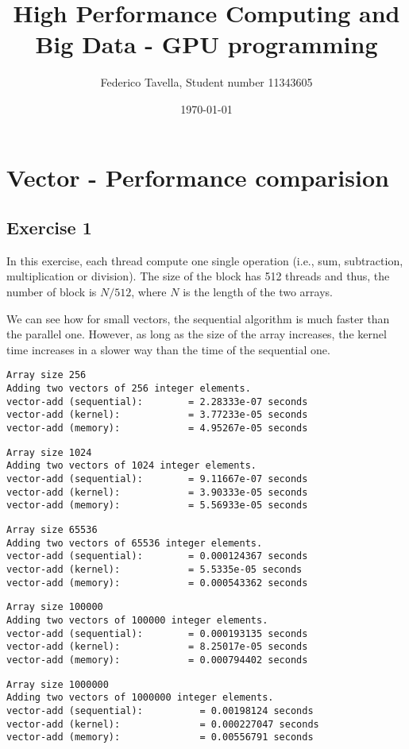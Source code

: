 \documentclass[a4paper]{article}
\title{High Performance Computing and Big Data - GPU programming}
\author{Federico Tavella, Student number 11343605}
\date{\today}
\begin{document}
\maketitle

\section{Vector - Performance comparision}

\subsection{Exercise 1}

In this exercise, each thread compute one single operation (i.e., sum, subtraction, multiplication or division). The size of the block has 512 threads and thus, the number of block is $N/512$, where $N$ is the length of the two arrays.

We can see how for small vectors, the sequential algorithm is much faster than the parallel one. However, as long as the size of the array increases, the kernel time increases in a slower way than the time of the sequential one.

\begin{verbatim}
Array size 256
Adding two vectors of 256 integer elements.
vector-add (sequential):        = 2.28333e-07 seconds
vector-add (kernel):            = 3.77233e-05 seconds
vector-add (memory):            = 4.95267e-05 seconds
\end{verbatim}
\begin{verbatim}
Array size 1024
Adding two vectors of 1024 integer elements.
vector-add (sequential):        = 9.11667e-07 seconds
vector-add (kernel):            = 3.90333e-05 seconds
vector-add (memory):            = 5.56933e-05 seconds
\end{verbatim}
\begin{verbatim}
Array size 65536
Adding two vectors of 65536 integer elements.
vector-add (sequential):        = 0.000124367 seconds
vector-add (kernel):            = 5.5335e-05 seconds
vector-add (memory):            = 0.000543362 seconds
\end{verbatim}
\begin{verbatim}
Array size 100000
Adding two vectors of 100000 integer elements.
vector-add (sequential):        = 0.000193135 seconds
vector-add (kernel):            = 8.25017e-05 seconds
vector-add (memory):            = 0.000794402 seconds
\end{verbatim}
\begin{verbatim}
Array size 1000000
Adding two vectors of 1000000 integer elements.
vector-add (sequential): 	      = 0.00198124 seconds
vector-add (kernel): 	          = 0.000227047 seconds
vector-add (memory): 	          = 0.00556791 seconds
\end{verbatim}
\end{document}
